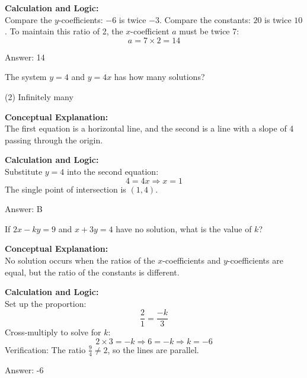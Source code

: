 \documentclass[11pt,paper=a4,answers]{exam}
\begin{document}
\begin{questions}
\begin{solution}
\vspace{10pt}
\textbf{Calculation and Logic:} \\
Compare the $y$-coefficients: $-6$ is twice $-3$.
Compare the constants: $20$ is twice $10$.
To maintain this ratio of 2, the $x$-coefficient $a$ must be twice 7:
\[ a = 7 \times 2 = 14 \]

\vspace{15pt}
Answer: \colorbox{yellow!100}{14}
\end{solution}

\question
The system $y = 4$ and $y = 4x$ has how many solutions?
\begin{tasks}(2)
    \task Infinitely many
\end{tasks}

\begin{solution}
\textbf{Conceptual Explanation:} \\
The first equation is a horizontal line, and the second is a line with a slope of 4 passing through the origin.

\vspace{10pt}
\textbf{Calculation and Logic:} \\
Substitute $y = 4$ into the second equation:
\[ 4 = 4x \Rightarrow x = 1 \]
The single point of intersection is $(1, 4)$.

\vspace{15pt}
Answer: \colorbox{yellow!100}{B}
\end{solution}

\question
If $2x - ky = 9$ and $x + 3y = 4$ have no solution, what is the value of $k$?

\begin{solution}
\textbf{Conceptual Explanation:} \\
No solution occurs when the ratios of the $x$-coefficients and $y$-coefficients are equal, but the ratio of the constants is different.

\vspace{10pt}
\textbf{Calculation and Logic:} \\
Set up the proportion:
\[ \frac{2}{1} = \frac{-k}{3} \]
Cross-multiply to solve for $k$:
\[ 2 \times 3 = -k \Rightarrow 6 = -k \Rightarrow k = -6 \]
Verification: The ratio $\frac{9}{4} \neq 2$, so the lines are parallel.

\vspace{15pt}
Answer: \colorbox{yellow!100}{-6}
\end{solution}


\end{questions}
\end{document}

